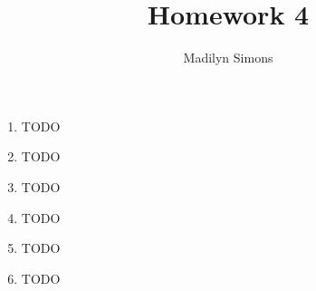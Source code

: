 \documentclass{article}
\title{Homework 4}
\author{Madilyn Simons}
\date{}
\begin{document}
\maketitle

\begin{enumerate}

\item TODO

\item TODO

\item TODO

\item TODO

\item TODO

\item TODO

\end{enumerate}
\end{document}
